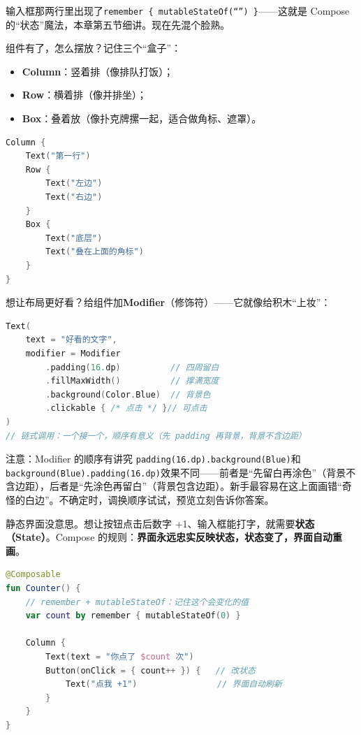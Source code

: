 输入框那两行里出现了\texttt{remember \{ mutableStateOf(“”) \}}——这就是 Compose 的“状态”魔法，本章第五节细讲。现在先混个脸熟。


组件有了，怎么摆放？记住三个“盒子”：

\begin{itemize}
  \item \textbf{Column}：竖着排（像排队打饭）；
  \item \textbf{Row}：横着排（像并排坐）；
  \item \textbf{Box}：叠着放（像扑克牌摞一起，适合做角标、遮罩）。
\end{itemize}

\begin{lstlisting}[language=Kotlin]
Column {
    Text("第一行")
    Row {
        Text("左边")
        Text("右边")
    }
    Box {
        Text("底层")
        Text("叠在上面的角标")
    }
}
\end{lstlisting}

想让布局更好看？给组件加\textbf{Modifier}（修饰符）——它就像给积木“上妆”：

\begin{lstlisting}[language=Kotlin]
Text(
    text = "好看的文字",
    modifier = Modifier
        .padding(16.dp)          // 四周留白
        .fillMaxWidth()          // 撑满宽度
        .background(Color.Blue)  // 背景色
        .clickable { /* 点击 */ }// 可点击
)
// 链式调用：一个接一个，顺序有意义（先 padding 再背景，背景不含边距）
\end{lstlisting}

\begin{tcbwarn}{注意：Modifier 的顺序有讲究}
\texttt{padding(16.\allowbreak dp).\allowbreak background(Blue)}和\texttt{background(Blue).\allowbreak padding(16.\allowbreak dp)}效果不同——前者是“先留白再涂色”（背景不含边距），后者是“先涂色再留白”（背景包含边距）。新手最容易在这上面画错“奇怪的白边”。不确定时，调换顺序试试，预览立刻告诉你答案。

\end{tcbwarn}


静态界面没意思。想让按钮点击后数字 +1、输入框能打字，就需要\textbf{状态（State）}。Compose 的规则：\textbf{界面永远忠实反映状态，状态变了，界面自动重画}。

\begin{lstlisting}[language=Kotlin]
@Composable
fun Counter() {
    // remember + mutableStateOf：记住这个会变化的值
    var count by remember { mutableStateOf(0) }

    Column {
        Text(text = "你点了 $count 次")
        Button(onClick = { count++ }) {   // 改状态
            Text("点我 +1")                // 界面自动刷新
        }
    }
}
\end{lstlisting}

